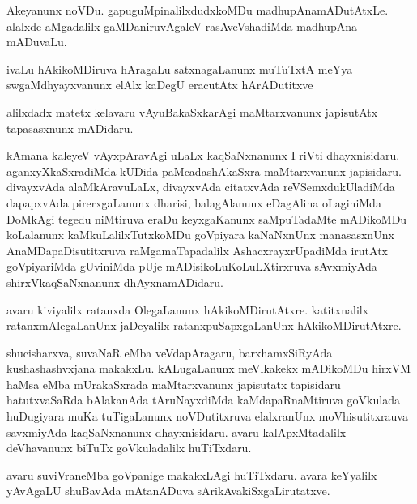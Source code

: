 \documentclass{article}
\begin{document}
\begin{mn}%
Akeyanunx noVDu. gapuguMpinalilxdudxkoMDu madhupAnamADutAtxLe. alalxde aMgadalilx 
gaMDaniruvAgaleV rasAveVshadiMda madhupAna mADuvaLu.
\end{mn}

\begin{mn}%
ivaLu hAkikoMDiruva hAragaLu satxnagaLanunx muTuTxtA meYya swgaMdhyayxvanunx elAlx kaDegU 
eracutAtx hArADutitxve
\end{mn}

\begin{mn}%
alilxdadx matetx kelavaru vAyuBakaSxkarAgi maMtarxvanunx japisutAtx tapasasxnunx mADidaru.
\end{mn}

\begin{mn}%
kAmana kaleyeV vAyxpAravAgi uLaLx kaqSaNxnanunx I riVti dhayxnisidaru. aganxyXkaSxradiMda 
kUDida paMcadashAkaSxra maMtarxvanunx japisidaru. divayxvAda alaMkAravuLaLx, divayxvAda 
citatxvAda reVSemxdukUladiMda dapapxvAda pirerxgaLanunx dharisi, balagAlanunx eDagAlina 
oLaginiMda DoMkAgi tegedu niMtiruva eraDu keyxgaKanunx saMpuTadaMte mADikoMDu koLalanunx 
kaMkuLalilxTutxkoMDu goVpiyara kaNaNxnUnx manasasxnUnx AnaMDapaDisutitxruva 
raMgamaTapadalilx AshacxrayxrUpadiMda irutAtx goVpiyariMda gUviniMda pUje 
mADisikoLuKoLuLXtirxruva sAvxmiyAda shirxVkaqSaNxnanunx dhAyxnamADidaru.
\end{mn}

\begin{mn}%
avaru kiviyalilx ratanxda OlegaLanunx hAkikoMDirutAtxre. katitxnalilx ratanxmAlegaLanUnx 
jaDeyalilx ratanxpuSapxgaLanUnx hAkikoMDirutAtxre.
\end{mn}

\begin{mn}%
shucisharxva, suvaNaR eMba veVdapAragaru, barxhamxSiRyAda kushashashvxjana makakxLu. 
kALugaLanunx meVlkakekx mADikoMDu hirxVM haMsa eMba mUrakaSxrada maMtarxvanunx japisutatx 
tapisidaru hatutxvaSaRda bAlakanAda tAruNayxdiMda kaMdapaRnaMtiruva goVkulada huDugiyara 
muKa tuTigaLanunx noVDutitxruva elalxranUnx moVhisutitxrauva savxmiyAda kaqSaNxnanunx 
dhayxnisidaru. avaru kalApxMtadalilx deVhavanunx biTuTx goVkuladalilx huTiTxdaru.
\end{mn}

\begin{mn}%
avaru suviVraneMba goVpanige makakxLAgi huTiTxdaru. avara keYyalilx yAvAgaLU shuBavAda 
mAtanADuva sArikAvakiSxgaLirutatxve.
\end{mn}
\end{document}
